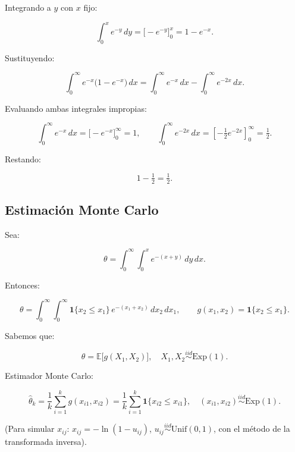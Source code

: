 \documentclass[11pt]{article}
\begin{document}
Integrando a \(y\) con \(x\) fijo:

\[
\int_{0}^{x} e^{-y}\,dy=\big[-e^{-y}\big]_{0}^{x}=1-e^{-x}.
\]

Sustituyendo:

\[
\int_{0}^{\infty} e^{-x}\big(1-e^{-x}\big)\,dx
=\int_{0}^{\infty} e^{-x}\,dx-\int_{0}^{\infty} e^{-2x}\,dx.
\]

Evaluando ambas integrales impropias:

\[
\int_{0}^{\infty} e^{-x}\,dx=\big[-e^{-x}\big]_{0}^{\infty}=1,\qquad
\int_{0}^{\infty} e^{-2x}\,dx=\left[-\tfrac{1}{2}e^{-2x}\right]_{0}^{\infty}=\tfrac{1}{2}.
\]

Restando:

\[
1-\tfrac{1}{2}=\tfrac{1}{2}.
\]

    \hypertarget{estimaciuxf3n-monte-carlo}{%
\subsection{Estimación Monte Carlo}\label{estimaciuxf3n-monte-carlo}}

Sea:

\[
\theta=\int_{0}^{\infty}\!\!\int_{0}^{x} e^{-(x+y)}\,dy\,dx.
\]

Entonces:

\[
\theta=\int_{0}^{\infty}\!\!\int_{0}^{\infty}\mathbf{1}\{x_2\le x_1\}\,e^{-(x_1+x_2)}\,dx_2\,dx_1,
\qquad g(x_1,x_2)=\mathbf{1}\{x_2\le x_1\}.
\]

Sabemos que:

\[
\theta=\mathbb{E}\big[g(X_1,X_2)\big],\quad X_1,X_2\stackrel{iid}{\sim}\mathrm{Exp}(1).
\]

Estimador Monte Carlo:

\[
\widehat{\theta}_k=\frac{1}{k}\sum_{i=1}^{k} g(x_{i1},x_{i2})
=\frac{1}{k}\sum_{i=1}^{k}\mathbf{1}\{x_{i2}\le x_{i1}\},
\quad (x_{i1},x_{i2})\stackrel{iid}{\sim}\mathrm{Exp}(1).
\]

(Para simular \(x_{ij}\): \(x_{ij}=-\ln(1-u_{ij})\),
\(u_{ij}\stackrel{iid}{\sim}\mathrm{Unif}(0,1)\), con el método de la
transformada inversa).
\end{document}
